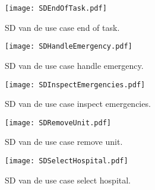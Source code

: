 \begin{figure}[h!]
  \centering
  \texttt{[image: SDEndOfTask.pdf]}
  \caption{SD van de use case end of task.}
\end{figure}

\begin{figure}[h!]
  \centering
  \texttt{[image: SDHandleEmergency.pdf]}
  \caption{SD van de use case handle emergency.}
\end{figure}

\begin{figure}[h!]
  \centering
  \texttt{[image: SDInspectEmergencies.pdf]}
  \caption{SD van de use case inspect emergencies.}
\end{figure}

\begin{figure}[h!]
  \centering
  \texttt{[image: SDRemoveUnit.pdf]}
  \caption{SD van de use case remove unit.}
\end{figure}

\begin{figure}[h!]
  \centering
  \texttt{[image: SDSelectHospital.pdf]}
  \caption{SD van de use case select hospital.}
\end{figure}
